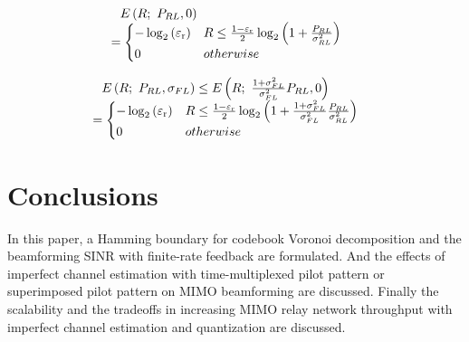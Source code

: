 \documentclass[10pt,fleqn, twocolumn]{IEEEtran}
\begin{document}
\begin{equation}\hspace{-0.1in}
\begin{array}{l}
E\left(R;\ P_{\mbox{\tiny RL}},0\right)\\
\hspace{-0.10in}=\begin{cases} -\log_{2}\left(\varepsilon_{\rm
r}\right) & R \leq \frac{1-\varepsilon_{\rm
r}}{2}\log_{2}\left(1+\frac{P_{\mbox{\tiny
RL}}}{\sigma_{\mbox{\tiny RL}}^{2}}\right) \\
0 & \mbox{otherwise}
\end{cases}
\end{array}
\end{equation}




\begin{equation}\hspace{-0.10in}
\begin{array}{l}
E\left(R;\ P_{\mbox{\tiny RL}},\sigma_{\mbox{\tiny FL}}\right)\leq
E\left(R;\ \frac{1+\sigma_{\mbox{\tiny
FL}}^{2}}{\sigma_{\mbox{\tiny FL}}^{2}}P_{\mbox{\tiny
RL}}, 0\right)\\
\hspace{-0.10in}=\begin{cases} -\log_{2}\left(\varepsilon_{\rm
r}\right) & R \leq \frac{1-\varepsilon_{\rm
r}}{2}\log_{2}\left(1+\frac{1+\sigma_{\mbox{\tiny
FL}}^{2}}{\sigma_{\mbox{\tiny FL}}^{2}}\frac{P_{\mbox{\tiny
RL}}}{\sigma_{\mbox{\tiny RL}}^{2}}\right) \\
0 & \mbox{otherwise}
\end{cases}
\end{array}
\end{equation}


\section{Conclusions}
In this paper, a Hamming boundary for codebook Voronoi
decomposition and the beamforming SINR with finite-rate feedback
are formulated. And the effects of imperfect channel estimation
with time-multiplexed pilot pattern or superimposed pilot pattern
on MIMO beamforming are discussed. Finally the scalability and the
tradeoffs in increasing MIMO relay network throughput with
imperfect channel estimation and quantization are discussed.

\small


\end{document}

